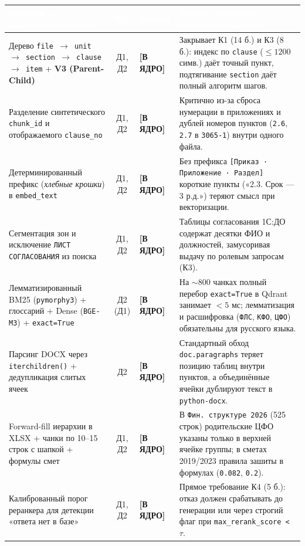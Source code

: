 \documentclass[10pt,a4paper]{article}
\newcommand{\keep}{\textbf{\textcolor{GreenTag}{[В ЯДРО]}}}
\begin{document}
{\footnotesize
{}
\begin{tabularx}{\textwidth}{@{} >{\raggedright\arraybackslash}p{} c >{\raggedright\arraybackslash}p{} >{\raggedright\arraybackslash}X @{}}
\toprule
\rowcolor{HeaderBg}
\textcolor{white}{\textbf{Полезные и дорабатываемые идеи}} & \textcolor{white}{\textbf{Ист.}} & \textcolor{white}{\textbf{Вердикт}} & \textcolor{white}{\textbf{Краткое обоснование относительно проекта}} \\
\midrule
Дерево \texttt{file $\to$ unit $\to$ section $\to$ clause $\to$ item} + \textbf{V3 (Parent-Child)} & Д1, Д2 & \keep & Закрывает К1 (14 б.) и К3 (8 б.): индекс по \texttt{clause} ($\le 1200$ симв.) даёт точный пункт, подтягивание \texttt{section} даёт полный алгоритм шагов. \\
Разделение синтетического \texttt{chunk\_id} и отображаемого \texttt{clause\_no} & Д1, Д2 & \keep & Критично из-за сброса нумерации в приложениях и дублей номеров пунктов (\texttt{2.6}, \texttt{2.7} в \texttt{3065-1}) внутри одного файла. \\
Детерминированный префикс (\textit{хлебные крошки}) в \texttt{embed\_text} & Д1, Д2 & \keep & Без префикса \texttt{[Приказ · Приложение · Раздел]} короткие пункты («2.3. Срок — 3 р.д.») теряют смысл при векторизации. \\
Сегментация зон и исключение \texttt{ЛИСТ СОГЛАСОВАНИЯ} из поиска & Д1, Д2 & \keep & Таблицы согласования 1С:ДО содержат десятки ФИО и должностей, замусоривая выдачу по ролевым запросам (К3). \\
Лемматизированный BM25 (\texttt{pymorphy3}) + глоссарий + Dense (\texttt{BGE-M3}) + \texttt{exact=True} & Д2 (Д1) & \keep & На $\sim$800 чанках полный перебор \texttt{exact=True} в Qdrant занимает $<5$ мс; лемматизация и расшифровка (\texttt{ФЛС}, \texttt{КФО}, \texttt{ЦФО}) обязательны для русского языка. \\
Парсинг DOCX через \texttt{iterchildren()} + дедупликация слитых ячеек & Д2 & \keep & Стандартный обход \texttt{doc.paragraphs} теряет позицию таблиц внутри пунктов, а объединённые ячейки дублируют текст в \texttt{python-docx}. \\
Forward-fill иерархии в XLSX + чанки по 10--15 строк с шапкой + формулы смет & Д1, Д2 & \keep & В \texttt{Фин. структуре 2026} (525 строк) родительские ЦФО указаны только в верхней ячейке группы; в сметах 2019/2023 правила зашиты в формулах (\texttt{0.082}, \texttt{0.2}). \\
Калиброванный порог реранкера для детекции «ответа нет в базе» & Д1, Д2 & \keep & Прямое требование К4 (5 б.): отказ должен срабатывать до генерации или через строгий флаг при \texttt{max\_rerank\_score < $\tau$}. \\

\end{tabularx}}
\end{document}
